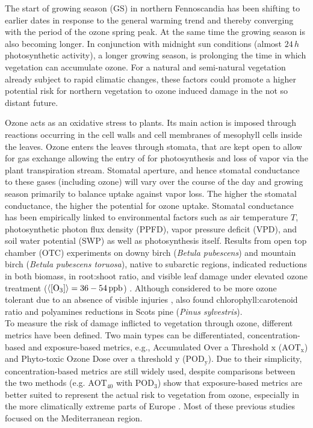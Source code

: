 \documentclass[bg, manuscript]{copernicus}
\begin{document}
The start of growing season (GS) in northern Fennoscandia has been shifting to earlier dates in response to the general warming trend \citep[e.g.,]{GCB:Menzel2006,RS:Hogda2013,IJB:Karlsen2007} and thereby converging with the period of the ozone spring peak. At the same time the growing season is also becoming longer. In conjunction with midnight sun conditions (almost $24\,\unit{h}$ photosynthetic activity), a longer growing season, is prolonging the time in which vegetation can accumulate ozone. For a natural and semi-natural vegetation already subject to rapid climatic changes, these factors could promote a higher potential risk for northern vegetation to ozone induced damage in the not so distant future.

Ozone acts as an oxidative stress to plants. Its main action is imposed through reactions occurring in the cell walls and cell membranes of mesophyll cells inside the leaves. Ozone enters the leaves through stomata, that are kept open to allow for gas exchange allowing the entry of  for photosynthesis and loss of  vapor via the plant transpiration stream. Stomatal aperture, and hence stomatal conductance to these gases (including ozone) will vary over the course of the day and growing season primarily to balance  uptake against  vapor loss. The higher the stomatal conductance, the higher the potential for ozone uptake. Stomatal conductance has been empirically linked to environmental factors such as air temperature $T$, photosynthetic photon flux density (PPFD), vapor pressure deficit (VPD), and soil water potential (SWP) as well as photosynthesis itself. Results from open top chamber (OTC) experiments on downy birch (\emph{Betula pubescens}) and mountain birch (\emph{Betula pubescens toruosa}), native to subarctic regions, indicated reductions in both biomass, in root:shoot ratio, and visible leaf damage under elevated ozone treatment ($\left<\chem{[O_3]}\right> = 36-54\,\unit{ppb}$) \citep{Amb:Manninen2009}. Although considered to be more ozone tolerant due to an absence of visible injuries \citep{Amb:Girgzdiene2009}, \citet{Amb:Manninen2009} also found chlorophyll:carotenoid ratio and polyamines reductions in Scots pine (\emph{Pinus sylvestris}).\\

To measure the risk of damage inflicted to vegetation through ozone, different metrics have been defined. Two main types can be differentiated, concentration-based and exposure-based metrics, e.g., Accumulated Over a Threshold $\mathrm{x}$ ($\mathrm{AOT_x}$) and Phyto-toxic Ozone Dose over a threshold $\mathrm{y}$ ($\mathrm{POD_y}$). Due to their simplicity, concentration-based metrics are still widely used, despite comparisons between the two methods (e.g. $\mathrm{AOT_{40}}$ with $\mathrm{POD_3}$) show that exposure-based metrics are better suited to represent the actual risk to vegetation from ozone, especially in the more climatically extreme parts of Europe \citep{GCB:Mills2010,ICP:MappingManual2017}. Most of these previous studies focused on the Mediterranean region.
\end{document}
